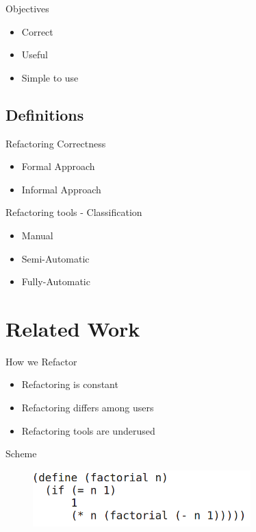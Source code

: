 \documentclass[xcolor=dvipsnames, 14pt]{beamer}
\begin{document}
\begin{frame}{Objectives}%
  \begin{itemize}
  \setlength\itemsep{2em}
  \item {
    Correct
  }
  \item {
    Useful
  }
  \item {
    Simple to use
  }
  \end{itemize}
\end{frame}

\subsection{Definitions}
\begin{frame}{Refactoring Correctness}
\begin{itemize}
\setlength\itemsep{2em}
\item Formal Approach
\item Informal Approach
\end{itemize}
\end{frame}
\begin{frame}{Refactoring tools - Classification}
  \begin{itemize}
  \setlength\itemsep{2em}
  \item {
    Manual
  }
  \item {
    Semi-Automatic
  }
  \item {
    Fully-Automatic
  }
  \end{itemize}
\end{frame}
\section{Related Work}

\begin{frame}{How we Refactor}
  \begin{itemize}
  \setlength\itemsep{2em}
  \item {
    Refactoring is constant
  }
  \item {
    Refactoring differs among users
  }
  \item {
    Refactoring tools are underused
  }
  \end{itemize}
\end{frame}
\begin{frame}{Scheme}
    \begin{figure}[htbp]
      \centering
      \includegraphics[width=0.75\textwidth]{img/SchemeCode2.png}
      \label{fig:Scheme}
    \end{figure}
\end{frame}
\end{document}
